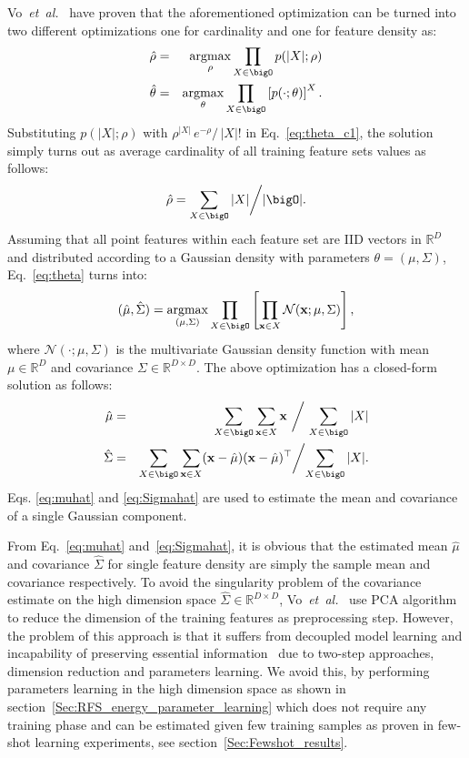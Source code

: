 \documentclass[journal]{IEEEtran}
\newcommand \argmax {\operatorname*{argmax}}
\newcommand \andothers {\textit{et~al.}}
\begin{document}
Vo~\andothers~\cite{vo2018model} have proven that the aforementioned optimization can be turned into two different optimizations one for cardinality and one for feature density as:
\begin{eqnarray}
\hat{\rho} & = & \argmax_{\rho} \prod_{X\in\bigO} p(|X|;\rho) \label{eq:theta_c1} \\
\hat{\theta} & = & \argmax_{\theta} \prod_{X\in\bigO} \left[p(\cdot;\theta)\right]^{X}. \label{eq:theta}
\end{eqnarray}
Substituting $p(|X|;\rho)$ with $\rho^{|X|}\,e^{-\rho}\big/\,|X|!$ in Eq.~\ref{eq:theta_c1}, the solution simply turns out as average cardinality of all training feature sets values as follows:
\begin{equation}
\hat{\rho} = {\sum_{X\in\bigO} |X|}\bigg/{|\bigO|}.
\label{eq:rhohat}
\end{equation}
Assuming that all point features within each feature set are IID vectors in $\mathbb{R}^D$ and distributed according to a Gaussian density with parameters ${\theta} = (\mu,\Sigma)$, Eq.~\eqref{eq:theta} turns into:
\begin{eqnarray}
(\hat{\mu},\hat{\Sigma}) = \argmax_{(\mu,\Sigma)} \prod_{X\in\bigO} \left[\prod_{\mathbf{x}\in X}\mathcal{N}(\mathbf{x};\mu,\Sigma)\right],
\end{eqnarray}
where $\mathcal{N}(\cdot;\mu,\Sigma)$ is the multivariate Gaussian density function with mean $\mu \in \mathbb{R}^D$ and covariance $\Sigma\in \mathbb{R}^{D\times D}$. The above optimization has a closed-form solution as follows:
\begin{eqnarray}
\hat{\mu}&=& {\sum_{X\in\bigO}\sum_{\mathbf{x}\in X}\mathbf{x}}\ \bigg/\ {\sum_{X\in\bigO}|X|}\label{eq:muhat}\\
\hat{\Sigma}&=& {\sum_{X\in\bigO}\sum_{\mathbf{x}\in X}(\mathit{\mathbf{x}}-\hat{\mu})(\mathit{\mathbf{x}}-\hat{\mu})^\top}\bigg/{\sum_{X\in\bigO}|X|}.\label{eq:Sigmahat}
\end{eqnarray}
Eqs. \eqref{eq:muhat} and \eqref{eq:Sigmahat} are used to estimate the mean and covariance of a single Gaussian component.

From Eq.~\ref{eq:muhat} and~\ref{eq:Sigmahat}, it is obvious that the estimated mean $\hat{\mu}$ and covariance $\hat{\Sigma}$ for single feature density are simply the sample mean and covariance respectively. 
To avoid the singularity problem of the covariance estimate on the high dimension space  $\hat{\Sigma}\in \mathbb{R}^{D\times D}$, Vo~\andothers~\cite{vo2018model} use PCA algorithm to reduce the dimension of the training features as preprocessing step. However, the problem of this approach is that it suffers from decoupled model learning and incapability of preserving essential information~\cite{zong2018deep} due to two-step approaches, dimension reduction and parameters learning. We avoid this, by performing parameters learning in the high dimension space as shown in section~\ref{Sec:RFS_energy_parameter_learning} which does not require any training phase and can be estimated given few training samples as proven in few-shot learning experiments, see section~\ref{Sec:Fewshot_results}.
\end{document}
